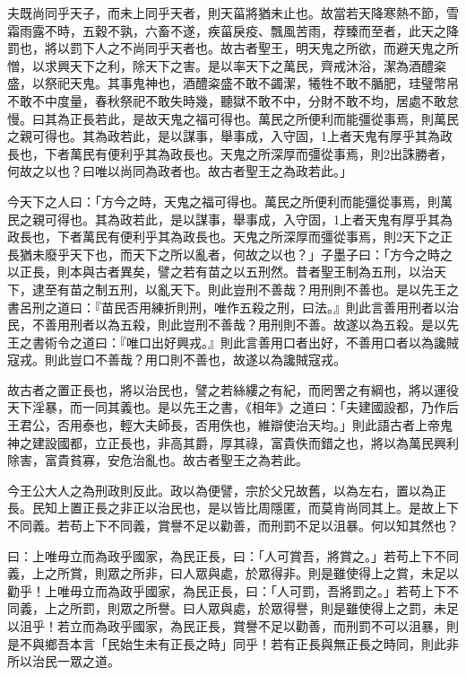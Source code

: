 \begin{pinyinscope}
夫既尚同乎天子，而未上同乎天者，則天菑將猶未止也。故當若天降寒熱不節，雪霜雨露不時，五穀不孰，六畜不遂，疾菑戾疫、飄風苦雨，荐臻而至者，此天之降罰也，將以罰下人之不尚同乎天者也。故古者聖王，明天鬼之所欲，而避天鬼之所憎，以求興天下之利，除天下之害。是以率天下之萬民，齊戒沐浴，潔為酒醴粢盛，以祭祀天鬼。其事鬼神也，酒醴粢盛不敢不蠲潔，犧牲不敢不腯肥，珪璧幣帛不敢不中度量，春秋祭祀不敢失時幾，聽獄不敢不中，分財不敢不均，居處不敢怠慢。曰其為正長若此，是故天鬼之福可得也。萬民之所便利而能彊從事焉，則萬民之親可得也。其為政若此，是以謀事，舉事成，入守固，1上者天鬼有厚乎其為政長也，下者萬民有便利乎其為政長也。天鬼之所深厚而彊從事焉，則2出誅勝者，何故之以也？曰唯以尚同為政者也。故古者聖王之為政若此。」

今天下之人曰：「方今之時，天鬼之福可得也。萬民之所便利而能彊從事焉，則萬民之親可得也。其為政若此，是以謀事，舉事成，入守固，1上者天鬼有厚乎其為政長也，下者萬民有便利乎其為政長也。天鬼之所深厚而彊從事焉，則2天下之正長猶未廢乎天下也，而天下之所以亂者，何故之以也？」子墨子曰：「方今之時之以正長，則本與古者異矣，譬之若有苗之以五刑然。昔者聖王制為五刑，以治天下，逮至有苗之制五刑，以亂天下。則此豈刑不善哉？用刑則不善也。是以先王之書呂刑之道曰：『苗民否用練折則刑，唯作五殺之刑，曰法。』則此言善用刑者以治民，不善用刑者以為五殺，則此豈刑不善哉？用刑則不善。故遂以為五殺。是以先王之書術令之道曰：『唯口出好興戎。』則此言善用口者出好，不善用口者以為讒賊寇戎。則此豈口不善哉？用口則不善也，故遂以為讒賊寇戎。

故古者之置正長也，將以治民也，譬之若絲縷之有紀，而罔罟之有綱也，將以運役天下淫暴，而一同其義也。是以先王之書，《相年》之道曰：「夫建國設都，乃作后王君公，否用泰也，輕大夫師長，否用佚也，維辯使治天均。」則此語古者上帝鬼神之建設國都，立正長也，非高其爵，厚其祿，富貴佚而錯之也，將以為萬民興利除害，富貴貧寡，安危治亂也。故古者聖王之為若此。

今王公大人之為刑政則反此。政以為便譬，宗於父兄故舊，以為左右，置以為正長。民知上置正長之非正以治民也，是以皆比周隱匿，而莫肯尚同其上。是故上下不同義。若苟上下不同義，賞譽不足以勸善，而刑罰不足以沮暴。何以知其然也？

曰：上唯毋立而為政乎國家，為民正長，曰：「人可賞吾，將賞之。」若苟上下不同義，上之所賞，則眾之所非，曰人眾與處，於眾得非。則是雖使得上之賞，未足以勸乎！上唯毋立而為政乎國家，為民正長，曰：「人可罰，吾將罰之。」若苟上下不同義，上之所罰，則眾之所譽。曰人眾與處，於眾得譽，則是雖使得上之罰，未足以沮乎！若立而為政乎國家，為民正長，賞譽不足以勸善，而刑罰不可以沮暴，則是不與鄉吾本言「民始生未有正長之時」同乎！若有正長與無正長之時同，則此非所以治民一眾之道。


\end{pinyinscope}

